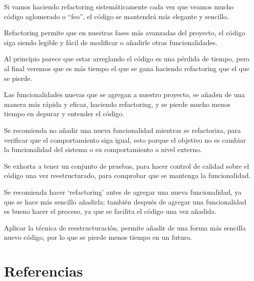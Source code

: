 \documentclass{article}
\begin{document}
\begin{compactitem}
\item Si vamos haciendo refactoring sistemáticamente cada vez que veamos mucho código 
  aglomerado o ``feo'', el código se mantendrá más elegante y sencillo.
\item Refactoring permite que en nuestras fases más avanzadas del proyecto, el código 
  siga siendo legible y fácil de modificar o añadirle otras funcionalidades.
\item Al principio parece que estar arreglando el código es una pérdida de tiempo, pero 
  al final veremos que es más tiempo el que se gana haciendo refactoring que el que 
  se pierde.
\item Las funcionalidades nuevas que se agregan a nuestro proyecto, se añaden de una manera 
  más rápida y eficaz, haciendo refactoring, y se pierde mucho menos tiempo en depurar y 
  entender el código.
\item Se recomienda no añadir una nueva funcionalidad mientras se refactoriza, para verificar 
  que el comportamiento siga igual, esto porque el objetivo no es cambiar la funcionalidad 
  del sistema o su comportamiento a nivel externo.
\item Se exhorta a tener un conjunto de pruebas, para hacer control de calidad sobre el código 
  una vez reestructurado, para comprobar que se mantenga la funcionalidad.
\item Se recomienda hacer `refactoring' antes de agregar una nueva funcionalidad, ya que se hace 
  más sencillo añadirla; también después de agregar una funcionalidad es bueno hacer el 
  proceso, ya que se facilita el código una vez añadida.
\item Aplicar la técnica de reestructuración, permite añadir de una forma más sencilla nuevo 
  código, por lo que se pierde menos tiempo en un futuro.
\end{compactitem}


\hypertarget{referencias}{}
\section{Referencias}
\end{document}
